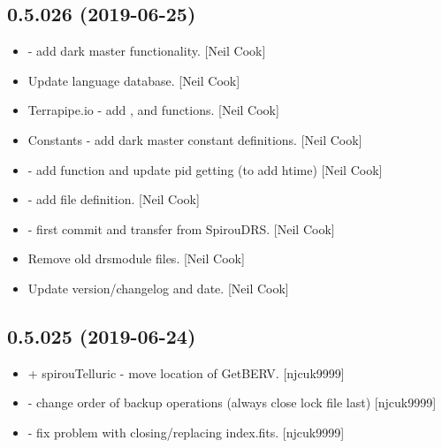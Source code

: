 \documentclass[a4paper,10pt,english]{report}
\begin{document}
\subsection{0.5.026 (2019-06-25)}
\label{\detokenize{misc/changelog:id111}}\begin{itemize}
\item {} 
 - add dark master functionality. {[}Neil Cook{]}

\item {} 
Update language database. {[}Neil Cook{]}

\item {} 
Terrapipe.io - add ,  and 
functions. {[}Neil Cook{]}

\item {} 
Constants - add dark master constant definitions. {[}Neil Cook{]}

\item {} 
 - add function  and update pid
getting (to add htime) {[}Neil Cook{]}

\item {} 
 - add  file definition. {[}Neil Cook{]}

\item {} 
 - first commit and transfer from SpirouDRS.
{[}Neil Cook{]}

\item {} 
Remove old drsmodule files. {[}Neil Cook{]}

\item {} 
Update version/changelog and date. {[}Neil Cook{]}

\end{itemize}


\subsection{0.5.025 (2019-06-24)}
\label{\detokenize{misc/changelog:id112}}\begin{itemize}
\item {} 
 + spirouTelluric - move location of GetBERV.
{[}njcuk9999{]}

\item {} 
 - change order of backup operations (always close lock
file last) {[}njcuk9999{]}

\item {} 
 - fix problem with closing/replacing index.fits.
{[}njcuk9999{]}

\end{itemize}
\end{document}

